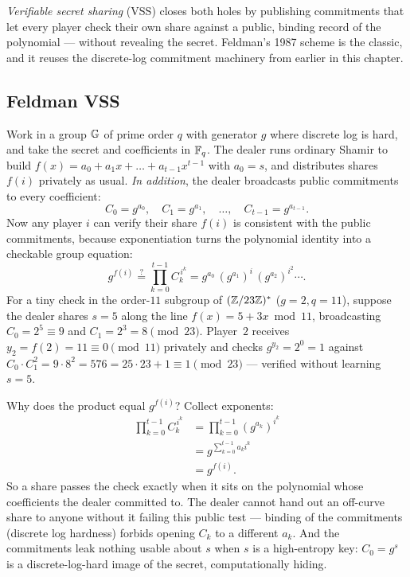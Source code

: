 \emph{Verifiable secret sharing} (VSS) closes both holes by publishing commitments that let every player check their own share against a public, binding record of the polynomial --- without revealing the secret. Feldman's 1987 scheme is the classic, and it reuses the discrete-log commitment machinery from earlier in this chapter.

\subsection{Feldman VSS}
\label{ch32:feldman}

Work in a group $\mathbb{G}$ of prime order $q$ with generator $g$ where discrete log is hard, and take the secret and coefficients in $\mathbb{F}_q$. The dealer runs ordinary Shamir to build $f(x) = a_0 + a_1 x + \dots + a_{t-1}x^{t-1}$ with $a_0 = s$, and distributes shares $f(i)$ privately as usual. \emph{In addition}, the dealer broadcasts public commitments to every coefficient:
\[
  C_0 = g^{a_0},\quad C_1 = g^{a_1},\quad \dots,\quad C_{t-1} = g^{a_{t-1}}.
\]
Now any player $i$ can verify their share $f(i)$ is consistent with the public commitments, because exponentiation turns the polynomial identity into a checkable group equation:
\[
  g^{f(i)} \stackrel{?}{=} \prod_{k=0}^{t-1} C_k^{\,i^{k}} = g^{a_0}\,(g^{a_1})^{i}\,(g^{a_2})^{i^2}\cdots .
\]
For a tiny check in the order-$11$ subgroup of $(\mathbb{Z}/23\mathbb{Z})^{*}$ ($g = 2, q = 11$), suppose the dealer shares $s = 5$ along the line $f(x) = 5 + 3x \bmod 11$, broadcasting $C_0 = 2^5 \equiv 9$ and $C_1 = 2^3 = 8 \pmod{23}$. Player~$2$ receives $y_2 = f(2) = 11 \equiv 0 \pmod{11}$ privately and checks $g^{y_2} = 2^0 = 1$ against $C_0 \cdot C_1^{2} = 9 \cdot 8^2 = 576 = 25\cdot 23 + 1 \equiv 1 \pmod{23}$ --- verified without learning $s = 5$.

\begin{whybox}
Why does the product equal $g^{f(i)}$? Collect exponents:
\begin{align*}
  \prod_{k=0}^{t-1} C_k^{\,i^k} &= \prod_{k=0}^{t-1} (g^{a_k})^{i^k} \\
                                &= g^{\sum_{k=0}^{t-1} a_k i^k} \\
                                &= g^{f(i)}.
\end{align*}
So a share passes the check exactly when it sits on the polynomial whose coefficients the dealer committed to. The dealer cannot hand out an off-curve share to anyone without it failing this public test --- binding of the commitments (discrete log hardness) forbids opening $C_k$ to a different $a_k$. And the commitments leak nothing usable about $s$ when $s$ is a high-entropy key: $C_0 = g^{s}$ is a discrete-log-hard image of the secret, computationally hiding.
\end{whybox}

